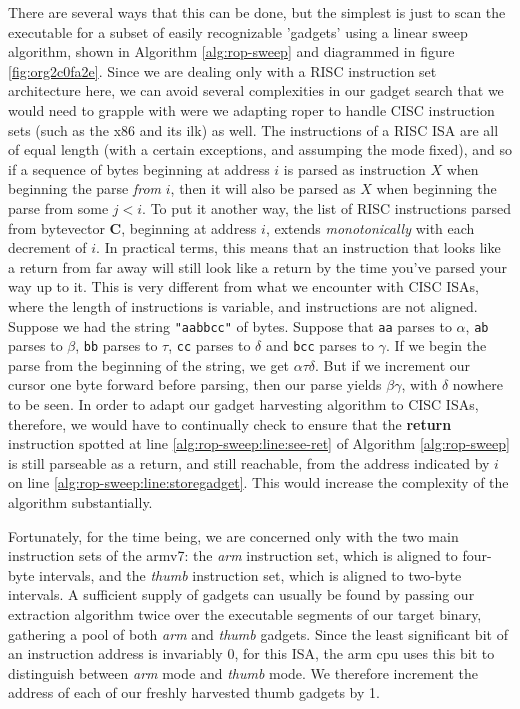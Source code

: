 \documentclass[12pt,glossary]{dalthesis}
\begin{document}
There are several ways that this can be done, but the simplest is just to
scan the executable for a subset of easily recognizable 'gadgets' using a
linear sweep algorithm, shown in Algorithm \ref{alg:rop-sweep} and diagrammed 
in figure \ref{fig:org2c0fa2e}. Since we are
dealing only with a RISC instruction set architecture here, we can avoid 
several complexities in our gadget search that we would need to grapple with
were we adapting \gls{roper} to handle CISC instruction sets (such as the x86 and
its ilk) as well. The instructions of a RISC ISA are all of equal length
(with a certain exceptions, and assumping the mode fixed), and so if a
sequence of bytes beginning at address \(i\) is parsed as instruction \(X\)
when beginning the parse \emph{from} \(i\), then it will also be parsed as \(X\)
when beginning the parse from some \(j < i\). To put it another way, the
list of RISC instructions parsed from bytevector \(\mathbf{C}\), beginning
at address \(i\), extends \emph{monotonically} with each decrement of \(i\).
In practical terms, this means that an instruction that looks like a
return from far away will still look like a return by the time you've parsed your
way up to it. This is very different from what we encounter with CISC ISAs,
where the length of instructions is variable, and instructions are not aligned.
Suppose we had the string \texttt{"aabbcc"} of bytes. Suppose that \texttt{aa} parses to
\(\alpha\), \texttt{ab} parses to \(\beta\), \texttt{bb} parses to \(\tau\), \texttt{cc} parses to \(\delta\) and
\texttt{bcc} parses to \(\gamma\). If we begin the parse from the beginning of the string,
we get \(\alpha \tau \delta\). But if we increment our cursor one byte forward
before parsing, then our parse yields \(\beta \gamma\), with \(\delta\) nowhere
to be seen. In order to adapt our gadget harvesting algorithm to CISC ISAs,
therefore, we would have to continually check to ensure that the \textbf{return}
instruction spotted at line \ref{alg:rop-sweep:line:see-ret} of
Algorithm \ref{alg:rop-sweep} is still parseable as a return, and still reachable, from
the address indicated by \(i\) on line \ref{alg:rop-sweep:line:storegadget}. This
would increase the complexity of the algorithm substantially. 

Fortunately, for the time being, we are concerned only with the two main instruction
sets of the \gls{armv7}: the \emph{arm} instruction set, which is aligned to four-byte intervals, 
and the \emph{thumb} instruction set, which is aligned to two-byte intervals. A sufficient
supply of gadgets can usually be found by passing our extraction algorithm twice
over the executable segments of our target binary, gathering a pool of both \emph{arm}
and \emph{thumb} gadgets. Since the least significant bit of an instruction address is
invariably 0, for this ISA, the \gls{arm} \gls{cpu} uses this bit to distinguish between \emph{arm}
mode and \emph{thumb} mode. We therefore increment the address of each of our freshly
harvested thumb gadgets by 1.
\end{document}

